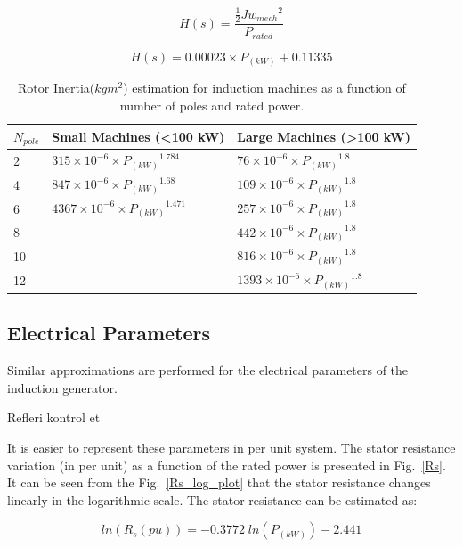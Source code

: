 \documentclass[twocolumn]{article}
\begin{document}
\begin{equation}
	H(s)=\frac{\frac{1}{2} J {w_{mech}}^2}{P_{rated}}
	\label{eq:time_constant}
\end{equation}

\begin{equation}
	H(s)=0.00023 \times P_{(kW)} + 0.11335
	\label{eq:time_constant_trend}
\end{equation}

\begin{table}
  \centering
  \begin{tabular}{lll}
   $N_{pole}$ & Small Machines (<100 kW) & Large Machines (>100 kW) \\
  \hline
2 & $315\times10^{-6}\times {P_{(kW)}}^{1.784}$ & $76\times10^{-6}\times {P_{(kW)}}^{1.8}$ \\
4 & $847\times10^{-6}\times {P_{(kW)}}^{1.68}$ & $109\times10^{-6}\times {P_{(kW)}}^{1.8}$ \\
6 & $4367\times10^{-6}\times {P_{(kW)}}^{1.471}$ & $257\times10^{-6}\times {P_{(kW)}}^{1.8}$ \\
8 &  & $442\times10^{-6}\times {P_{(kW)}}^{1.8}$ \\
10 & & $816\times10^{-6}\times {P_{(kW)}}^{1.8}$ \\
12 & & $1393\times10^{-6}\times {P_{(kW)}}^{1.8}$ \\
\hline
  \end{tabular}
  \caption{Rotor Inertia($kg m^2$) estimation for induction machines as a function of number of poles and rated power.}
  \label{inertia_estimation}
\end{table}


\subsection*{Electrical Parameters} %
\label{sub:electrical_parameters}

Similar approximations are performed for the electrical parameters of the induction generator.

Refleri kontrol et \cite{Thiringer2001} 

It is easier to represent these parameters in per unit system. The stator resistance variation (in per unit) as a function of the rated power is presented in Fig.~\ref{Rs}. It can be seen from the Fig.~\ref{Rs_log_plot} that the stator resistance changes linearly in the logarithmic scale. The stator resistance can be estimated as:

\begin{equation}
 	ln(R_s(pu))=-0.3772\;ln (P_{(kW)}) - 2.441
 	\label{eq:Rs}
 \end{equation} 
\end{document}
